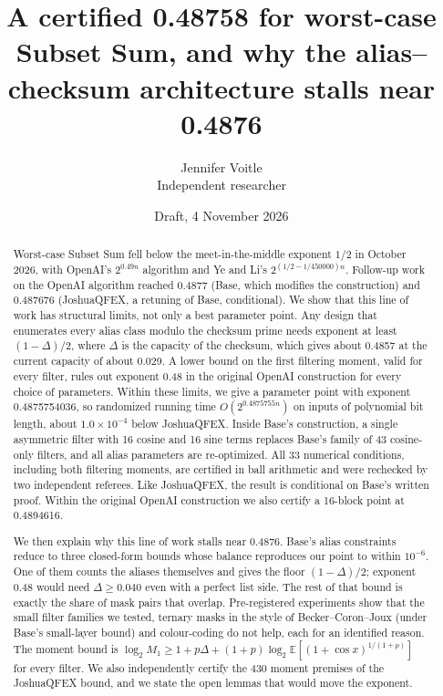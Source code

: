 \documentclass[11pt]{article}
\newcommand{\E}{\mathbb{E}}
\theoremstyle{plain}
\begin{document}
\title{A certified 0.48758 for worst-case Subset Sum, and why the alias--checksum architecture stalls near 0.4876}
\author{Jennifer Voitle\\ Independent researcher}
\date{Draft, 4 November 2026}

\maketitle

\begin{abstract}
Worst-case Subset Sum fell below the meet-in-the-middle exponent $1/2$ in October 2026, with OpenAI's $2^{0.49n}$ algorithm and Ye and Li's $2^{(1/2 - 1/450000)n}$. Follow-up work on the OpenAI algorithm reached 0.4877 (Base, which modifies the construction) and 0.487676 (JoshuaQFEX, a retuning of Base, conditional). We show that this line of work has structural limits, not only a best parameter point. Any design that enumerates every alias class modulo the checksum prime needs exponent at least $(1 - \Delta)/2$, where $\Delta$ is the capacity of the checksum, which gives about 0.4857 at the current capacity of about 0.029. A lower bound on the first filtering moment, valid for every filter, rules out exponent 0.48 in the original OpenAI construction for every choice of parameters. Within these limits, we give a parameter point with exponent 0.4875754036, so randomized running time $O(2^{0.4875755n})$ on inputs of polynomial bit length, about $1.0\times10^{-4}$ below JoshuaQFEX. Inside Base's construction, a single asymmetric filter with 16 cosine and 16 sine terms replaces Base's family of 43 cosine-only filters, and all alias parameters are re-optimized. All 33 numerical conditions, including both filtering moments, are certified in ball arithmetic and were rechecked by two independent referees. Like JoshuaQFEX, the result is conditional on Base's written proof. Within the original OpenAI construction we also certify a 16-block point at 0.4894616.

We then explain why this line of work stalls near 0.4876. Base's alias constraints reduce to three closed-form bounds whose balance reproduces our point to within $10^{-6}$. One of them counts the aliases themselves and gives the floor $(1 - \Delta)/2$; exponent 0.48 would need $\Delta \ge 0.040$ even with a perfect list side. The rest of that bound is exactly the share of mask pairs that overlap. Pre-registered experiments show that the small filter families we tested, ternary masks in the style of Becker--Coron--Joux (under Base's small-layer bound) and colour-coding do not help, each for an identified reason. The moment bound is $\log_2 M_1 \ge 1 + p\Delta + (1+p) \log_2 \E[(1+\cos x)^{1/(1+p)}]$ for every filter. We also independently certify the 430 moment premises of the JoshuaQFEX bound, and we state the open lemmas that would move the exponent.
\end{abstract}
\end{document}

